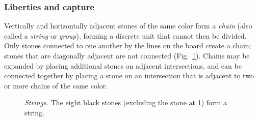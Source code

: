 \subsubsection{Liberties and capture}
Vertically and horizontally adjacent stones of the same color form a \emph{chain} (also called a \emph{string} or \emph{group}), forming a discrete unit that cannot then be divided. Only stones connected to one another by the lines on the board create a chain; stones that are diagonally adjacent are not connected (Fig.~\ref{Strings}). Chains may be expanded by placing additional stones on adjacent intersections, and can be connected together by placing a stone on an intersection that is adjacent to two or more chains of the same color.
\begin{figure}[h!t]
\centering
{}
\caption{\emph{Strings.} The eight black stones (excluding the stone at 1) form a string.}\label{Strings}
\end{figure}

